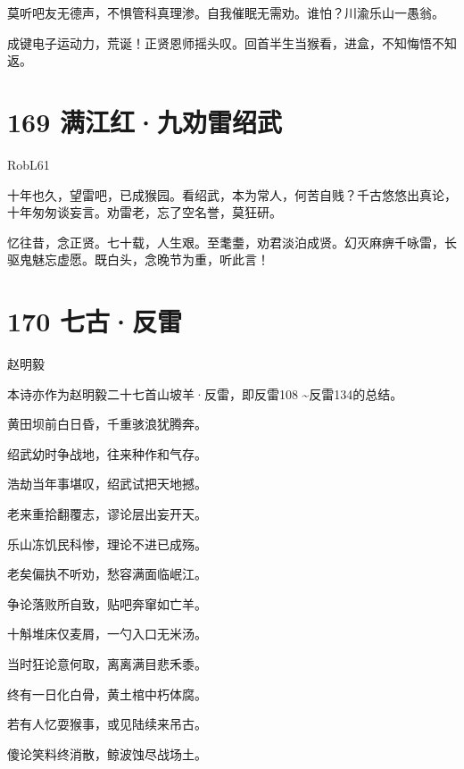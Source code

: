 \documentclass[UTF8,12pt,oneside]{ctexbook}
\begin{document}
        莫听吧友无德声，不惧管科真理渗。自我催眠无需劝。谁怕？川渝乐山一愚翁。
        
        成键电子运动力，荒诞！正贤恩师摇头叹。回首半生当猴看，进盒，不知悔悟不知返。
        ~\\
        
        \section{169 满江红·九劝雷绍武}
        \begin{center}
            RobL61
        \end{center}
        
        十年也久，望雷吧，已成猴园。看绍武，本为常人，何苦自贱？千古悠悠出真论，十年匆匆谈妄言。劝雷老，忘了空名誉，莫狂研。
        
        忆往昔，念正贤。七十载，人生艰。至耄耋，劝君淡泊成贤。幻灭麻痹千咏雷，长驱鬼魅忘虚愿。既白头，念晚节为重，听此言！

        \newpage
        
        \section{170 七古·反雷}
        
        \begin{center}
            赵明毅
        \end{center}
        
        \kaishu
        本诗亦作为赵明毅二十七首山坡羊·反雷，即反雷108 \textasciitilde 反雷134的总结。
        \songti

        \begin{center}
        黄田坝前白日昏，千重骇浪犹腾奔。
        
        绍武幼时争战地，往来种作和气存。
        
        浩劫当年事堪叹，绍武试把天地撼。
        
        老来重拾翻覆志，谬论层出妄开天。
        
        乐山冻饥民科惨，理论不进已成殇。
        
        老矣偏执不听劝，愁容满面临岷江。
        
        争论落败所自致，贴吧奔窜如亡羊。
        
        十斛堆床仅麦屑，一勺入口无米汤。
        
        当时狂论意何取，离离满目悲禾黍。
        
        终有一日化白骨，黄土棺中朽体腐。
        
        若有人忆耍猴事，或见陆续来吊古。
        
        傻论笑料终消散，鲸波蚀尽战场土。
        \end{center}
\end{document}
